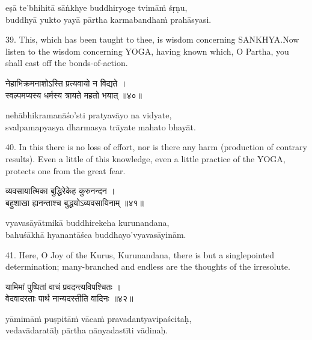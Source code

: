 \begin{transliteration}
eṣā te'bhihitā sāṅkhye buddhiryoge tvimāṁ śṛṇu, \\
buddhyā yukto yayā pārtha karmabandhaṁ prahāsyasi.
\end{transliteration}

39. This, which has been taught to thee, is wisdom concerning SANKHYA.\@ Now
listen to the wisdom concerning YOGA, having known which, O Partha, you shall
cast off the bonds-of-action.

\begin{gitaverse}
नेहाभिक्रमनाशोऽस्ति प्रत्यवायो न विद्यते । \\
स्वल्पमप्यस्य धर्मस्य त्रायते महतो भयात् ॥४०॥
\end{gitaverse}

\begin{transliteration}
nehābhikramanāśo'sti pratyavāyo na vidyate, \\
svalpamapyasya dharmasya trāyate mahato bhayāt.
\end{transliteration}

40. In this there is no loss of effort, nor is there any harm (production of
contrary results). Even a little of this knowledge, even a little practice of
the YOGA, protects one from the great fear.

\begin{gitaverse}
व्यवसायात्मिका बुद्धिरेकेह कुरुनन्दन । \\
बहुशाखा ह्यनन्ताश्च बुद्धयोऽव्यवसायिनाम् ॥४१॥
\end{gitaverse}

\begin{transliteration}
vyavasāyātmikā buddhirekeha kurunandana, \\
bahuśākhā hyanantāśca buddhayo'vyavasāyinām.
\end{transliteration}

41. Here, O Joy of the Kurus, Kurunandana, there is but a singlepointed
determination; many-branched and endless are the thoughts of the irresolute.

\begin{gitaverse}
यामिमां पुष्पितां वाचं प्रवदन्त्यविपश्चितः । \\
वेदवादरताः पार्थ नान्यदस्तीति वादिनः ॥४२॥
\end{gitaverse}

\begin{transliteration}
yāmimāṁ puṣpitāṁ vācaṁ pravadantyavipaścitaḥ, \\
vedavādaratāḥ pārtha nānyadastīti vādinaḥ.
\end{transliteration}

